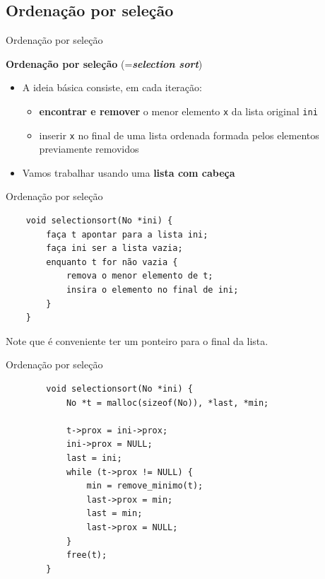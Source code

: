 \documentclass{beamer}
\newcommand{\cod}[1]{\texttt{#1}}
\newcommand{\textcolortwo}[2]{\textcolor{#1}{#2}}
\newcommand{\textblue}[1]{\textcolortwo{uiblue}{#1}}
\newcommand{\textbblue}[1]{\textbf{\textblue{#1}}}
\begin{document}
\subsection{Ordenação por seleção}

\begin{frame}[fragile]{Ordenação por seleção}

    \textbblue{Ordenação por seleção} (=\textbf{\emph{selection sort}})
    \begin{itemize}
        \item A ideia básica consiste, em cada iteração:
        \begin{itemize}
            \item \textbf{encontrar e remover} o menor elemento \cod{x} da lista original \cod{ini}
            \item inserir \cod{x} no final de uma lista ordenada formada pelos elementos previamente removidos
        \end{itemize}
        \item Vamos trabalhar usando uma \textbf{lista com cabeça}
    \end{itemize}
\end{frame}

\begin{frame}[fragile]{Ordenação por seleção}

    \begin{verbatim}
    void selectionsort(No *ini) {
        faça t apontar para a lista ini;
        faça ini ser a lista vazia;
        enquanto t for não vazia {
            remova o menor elemento de t;
            insira o elemento no final de ini;
        }
    }
    \end{verbatim}

    Note que é conveniente ter um ponteiro para o final da lista.
\end{frame}

\begin{frame}[fragile]{Ordenação por seleção}

    \begin{verbatim}
        void selectionsort(No *ini) {
            No *t = malloc(sizeof(No)), *last, *min;

            t->prox = ini->prox;
            ini->prox = NULL;
            last = ini;
            while (t->prox != NULL) {
                min = remove_minimo(t);
                last->prox = min;
                last = min;
                last->prox = NULL;
            }
            free(t);
        }
    \end{verbatim}

\end{frame}
\end{document}
